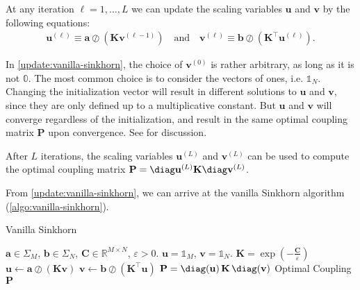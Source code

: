 \begin{update}\label{update:vanilla-sinkhorn}
  At any iteration $\ell = 1, \ldots, L$
  we can update the scaling variables $\mathbf{u}$ and $\mathbf{v}$ by the following equations:
  \begin{equation}
    \begin{aligned}
      \mathbf{u}^{(\ell)} \equiv \mathbf{a} \oslash (\mathbf{K}\mathbf{v}^{(\ell-1)})
      \quad\text{and}\quad
      \mathbf{v}^{(\ell)} \equiv \mathbf{b} \oslash (\mathbf{K}^\top \mathbf{u}^{(\ell)}).
    \end{aligned}
  \end{equation}
\end{update}

\begin{remark}
  In \cref{update:vanilla-sinkhorn}, the choice of $\mathbf{v}^{(0)}$ is rather arbitrary,
  as long as it is not $\mathbb{0}$.
  The most common choice is to consider the vectors of ones, i.e. $\mathbb{1}_N$.
  Changing the initialization vector will result in different solutions to $\mathbf{u}$ and $\mathbf{v}$,
  since they are only defined up to a multiplicative constant.
  But $\mathbf{u}$ and $\mathbf{v}$ will converge regardless of the initialization,
  and result in the same optimal coupling matrix $\mathbf{P}$ upon convergence.
  See \citet[p.82]{peyre2019} for discussion.
\end{remark}

After $L$ iterations, the scaling variables $\mathbf{u}^{(L)}$ and $\mathbf{v}^{(L)}$ can be used to compute the
optimal coupling matrix $\mathbf{P} = \diag\mathbf{u}^{(L)} \mathbf{K} \diag \mathbf{v}^{(L)}$.

From \cref{update:vanilla-sinkhorn}, we can arrive at the vanilla Sinkhorn algorithm (\cref{algo:vanilla-sinkhorn}).

\begin{algorithm}[H]
  \caption{Vanilla Sinkhorn}
  \begin{algorithmic}[1]\label{algo:vanilla-sinkhorn}
    \Require $\mathbf{a} \in \Sigma_M$, $\mathbf{b} \in \Sigma_N$, $\mathbf{C} \in \mathbb{R}^{M\times N}$, $\varepsilon > 0$.
    \Initialize $\mathbf{u} = \mathbb{1}_M$, $\mathbf{v} = \mathbb{1}_N$.
    \State $\mathbf{K} = \exp(-\frac{\mathbf{C}}{\varepsilon})$
    \State $\mathbf{u} \leftarrow \mathbf{a} \oslash (\mathbf{K} \mathbf{v})$
    \State $\mathbf{v} \leftarrow \mathbf{b} \oslash (\mathbf{K}^\top \mathbf{u})$
    \EndWhile
    \State $\mathbf{P} = \diag(\mathbf{u}) \, \mathbf{K} \, \diag(\mathbf{v})$
    \Ensure Optimal Coupling $\mathbf{P}$
  \end{algorithmic}
\end{algorithm}

